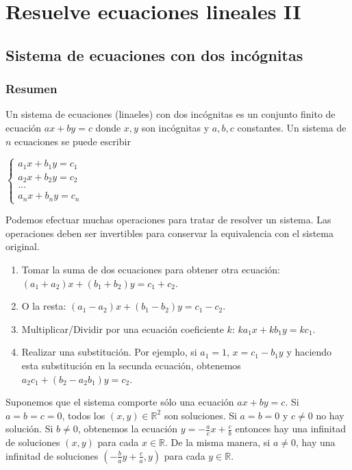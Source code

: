 \chapter{Resuelve ecuaciones lineales II}

\section{Sistema de ecuaciones con dos incógnitas}

\subsection*{Resumen}

Un sistema de ecuaciones (linaeles) con dos incógnitas es un conjunto finito
de ecuación $ax + by = c$ donde $x, y$ son incógnitas y $a,b,c$ constantes. Un
sistema de $n$ ecuaciones se puede escribir

$\left\{
\begin{aligned}
  a_1 x + b_1 y = c_1 \\
  a_2 x + b_2 y = c_2 \\
  \ldots \\
  a_n x + b_n y = c_n  
\end{aligned}\right.$

Podemos efectuar muchas operaciones para tratar de resolver un sistema. Las
operaciones deben ser invertibles para conservar la equivalencia con el sistema
original.

\begin{enumerate}
\item Tomar la suma de dos ecuaciones para obtener otra ecuación:
${(a_1+a_2)} x + {(b_1+b_2)} y = c_1 + c_2$.
\item O la resta: ${(a_1-a_2)} x + {(b_1-b_2)} y = c_1 - c_2$.
\item Multiplicar/Dividir por una ecuación coeficiente $k$:
  $k a_1 x + k b_1 y = k c_1$.
\item Realizar una substitución. Por ejemplo, si $a_1 = 1$,
  $x = c_1 - b_1 y$ y haciendo esta substitución en la secunda ecuación,
  obtenemos $a_2 c_1 + (b_2 - a_2 b_1) y  = c_2$.
\end{enumerate}

Suponemos que el sistema comporte sólo una ecuación $ax+by=c$.
Si $a = b = c = 0$, todos los $(x,y) \in {\mathbb R}^2$ son soluciones.
Si $a = b = 0$ y $c \neq 0$ no hay solución. Si $b \neq 0$, obtenemos la
ecuación $y = -\frac{a}{c}x +\frac{c}{b}$ entonces hay una infinitad de
soluciones
$(x, y)$ para cada $x \in {\mathbb R}$. De la misma manera, si $a \neq 0$, hay 
una infinitad de soluciones $({-\frac{b}{a}y+\frac{c}{a}}, y)$
para cada $y \in {\mathbb R}$.

